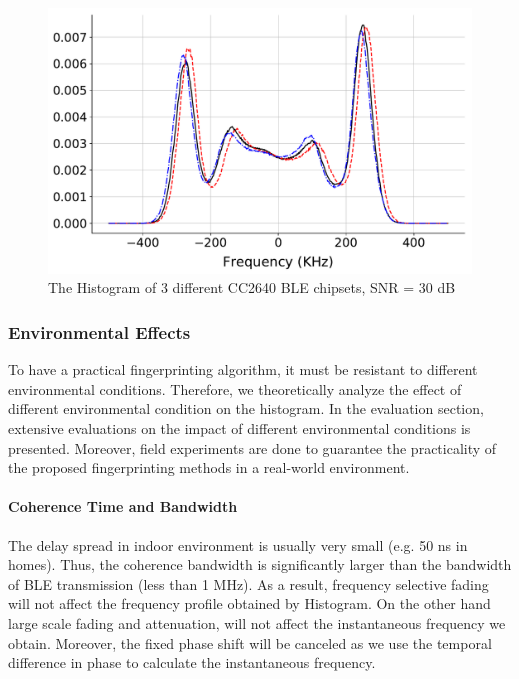 \begin{figure}[t!]
\centering
\includegraphics[width = \linewidth]{plots/Hist.pdf} 
\caption{The Histogram of 3 different CC2640 BLE chipsets, SNR = 30 dB}
\label{fig:3}
\end{figure}


\subsubsection{Environmental Effects}
\label{methodology:env}
To have a practical fingerprinting algorithm, it must be resistant to different environmental conditions. Therefore, we theoretically analyze the effect of different environmental condition on the histogram. In the evaluation section, extensive evaluations on the impact of different environmental conditions is presented. Moreover, field experiments are done to guarantee the practicality of the proposed fingerprinting methods in a real-world environment.

\paragraph{Coherence Time and Bandwidth} The delay spread in indoor environment is usually very small (e.g. 50 ns in homes). Thus, the coherence bandwidth is significantly larger than the bandwidth of BLE transmission (less than 1 MHz). As a result, frequency selective fading will not affect the frequency profile obtained by Histogram. On the other hand large scale fading and attenuation, will not affect the instantaneous frequency we obtain. Moreover, the fixed phase shift will be canceled as we use the temporal difference in phase to calculate the instantaneous frequency.

